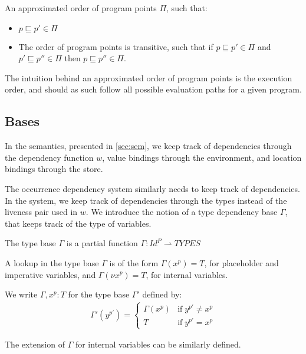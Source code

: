 \documentclass[../../master.tex]{subfiles}
\begin{document}
\begin{definition}
	An approximated order of program points $\Pi$, such that: 
	\begin{itemize}
		\item  $p\sqsubseteq p'\in\Pi$
		\item The order of program points is transitive, such that if $p\sqsubseteq p'\in\Pi$ and $p'\sqsubseteq p''\in\Pi$ then $p\sqsubseteq p''\in\Pi$.
	\end{itemize}
\end{definition}
The intuition behind an approximated order of program points is the execution order, and should as such follow all possible evaluation paths for a given program.

\iffalse
\subsection{Bases}
In the semantics, presented in \cref{sec:sem}, we keep track of dependencies through the dependency function $w$, value bindings through the environment, and location bindings through the store.

The occurrence dependency system similarly needs to keep track of dependencies.
In the system, we keep track of dependencies through the types instead of the liveness pair used in $w$.
We introduce the notion of a type dependency base $\Gamma$, that keeps track of the type of variables.

\begin{definition}
	The type base $\Gamma$ is a partial function $\Gamma:Id^P\rightharpoonup TYPES$
\end{definition}

A lookup in the type base $\Gamma$ is of the form $\Gamma(x^p)=T$, for placeholder and imperative variables, and $\Gamma(\nu x^p)=T$, for internal variables.

\begin{definition}
	We write $\Gamma,x^p:T$ for the type base $\Gamma'$ defined by:
	\begin{align*}
		\Gamma'(y^{p'})=
		\left\{\begin{matrix}
			\Gamma(x^p) & \mbox{if}\;y^{p'} \neq x^{p}\\ 
			T & \mbox{if}\;y^{p'} = x^{p}
		\end{matrix}\right.
	\end{align*}
\end{definition}
The extension of $\Gamma$ for internal variables can be similarly defined.
\bigskip
\end{document}
